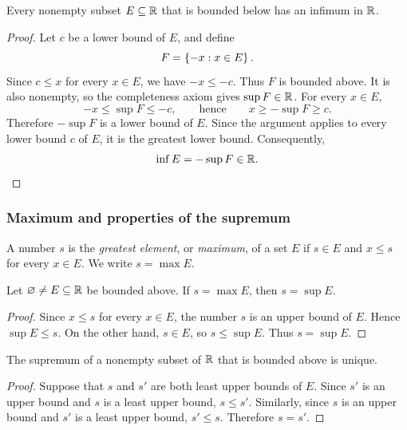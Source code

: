 \documentclass[11pt,a4paper]{amsart}
\begin{document}
\begin{corollary}
  Every nonempty subset \(E\subseteq\mathbb{R}\) that is bounded below has an
  infimum in \(\mathbb{R}\).
\end{corollary}

\begin{proof}
  Let \(c\) be a lower bound of \(E\), and define
  \[
    F=\left\lbrace-x:x\in E\right\rbrace.
  \]
  Since \(c\leq x\) for every \(x\in E\), we have \(-x\leq-c\).
  Thus \(F\) is bounded above. It is also nonempty, so the completeness
  axiom gives \(\sup F\in\mathbb{R}\). For every \(x\in E\),
  \[
    -x\leq\sup F\leq-c,
    \qquad\text{hence}\qquad
    x\geq-\sup F\geq c.
  \]
  Therefore \(-\sup F\) is a lower bound of \(E\). Since the argument
  applies to every lower bound \(c\) of \(E\), it is the greatest lower
  bound. Consequently,
  \[
    \inf E=-\sup F\in\mathbb{R}.
  \]
\end{proof}

\subsubsection{Maximum and properties of the supremum}

\begin{definition}
  A number \(s\) is the \emph{greatest element}, or \emph{maximum}, of
  a set \(E\) if \(s\in E\) and \(x\leq s\) for every \(x\in E\).
  We write \(s=\max E\).
\end{definition}

\begin{theorem}
  Let \(\varnothing\neq E\subseteq\mathbb{R}\) be bounded above. If
  \(s=\max E\), then \(s=\sup E\).
\end{theorem}

\begin{proof}
  Since \(x\leq s\) for every \(x\in E\), the number \(s\) is an upper
  bound of \(E\). Hence \(\sup E\leq s\). On the other hand, \(s\in E\),
  so \(s\leq\sup E\). Thus \(s=\sup E\).
\end{proof}

\begin{theorem}
  The supremum of a nonempty subset of \(\mathbb{R}\) that is bounded above
  is unique.
\end{theorem}

\begin{proof}
  Suppose that \(s\) and \(s'\) are both least upper bounds of \(E\).
  Since \(s'\) is an upper bound and \(s\) is a least upper bound,
  \(s\leq s'\). Similarly, since \(s\) is an upper bound and \(s'\) is a
  least upper bound, \(s'\leq s\). Therefore \(s=s'\).
\end{proof}
\end{document}
